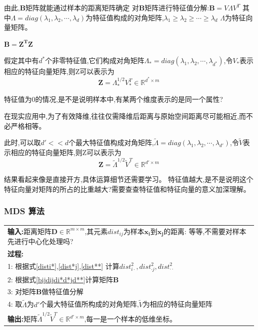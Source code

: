 \documentclass[UTF8,a4paper]{ctexart}%
\begin{document}
              由此,$\mathbf{B}$矩阵就能通过样本的距离矩阵确定
              对$\mathbf{B}$矩阵进行特征值分解:$\mathbf{B} = V\Lambda V^T$
              其中$\Lambda = diag(\lambda_1,\lambda_2,\cdots,\lambda_d)$为特征值构成的对角矩阵,$\lambda_1\geqslant \lambda_2\geqslant\cdots\geqslant\lambda_d$
              $\Lambda$为特征向量矩阵。

              $\mathbf{\mathbf{B}} = \mathbf{Z^TZ}$

              假定其中有$d^*$个非零特征值,它们构成对角矩阵$\Lambda_* = diag(\lambda_1,\lambda_2,\cdots,\lambda_{d^*})$,令$V_*$表示相应的特征向量矩阵,则Z可以表示为
              \[ \mathbf{Z} =\Lambda_*^{1/2}V_*^T \in \mathbb{R}^{d^* \times m}  \]

              {
              \color{red} 特征值为0的情况,是不是说明样本中,有某两个维度表示的是同一个属性?
              }

              在现实应用中,为了有效降维,往往仅需降维后距离与原始空间距离尽可能相近,而不必严格相等。

              此时,可以取$d' << d$个最大特征值构成对角矩阵,$\tilde{\Lambda } = diag(\lambda_1,\lambda_2,\cdots,\lambda_{d'} )$,令$\tilde{V}$表示相应的特征向量矩阵,则Z可以表示为
                \[ \mathbf{Z} =\tilde{\Lambda}^{1/2}\tilde{V}^T \in \mathbb{R}^{d' \times m}  \]

                {\color{red}
                    结果看起来像是直接开方,具体运算细节还需要学习。
                }
                {\color{red}
                  特征值越大,是不是说明这个特征向量对矩阵的所占的比重越大?需要查查特征值和特征向量的意义加深理解。
                }

            \subsubsection{MDS 算法}
            \begin{tabular}{l}
              \hline
              \textbf{输入:}距离矩阵$\mathbf{D} \in \mathbb{R}^{m \times m}$,其元素$dist_{ij}$为样本$\mathbf{x_i}$到$\mathbf{x_j}$的距离:
              {\color{red}等等,不需要对样本先进行中心化处理吗?}\\
            \textbf{过程:}\\
              1: 根据式\eqref{disti*},\eqref{dist*j},\eqref{dist**} 计算$    dist^2_{i \cdot},  dist^2_{\cdot j},dist^2_{\cdot \cdot}$\\
              2: 根据式\eqref{bijdijdi*d*jd**}计算矩阵$\mathbf{B}$\\
              3: 对矩阵$\mathbf{B}$做特征值分解\\
              4: 取$\tilde{\Lambda}$为$d'$个最大特征值所构成的对角矩阵,$\tilde{V}$为相应的特征向量矩阵\\
              \textbf{输出:}矩阵$\tilde{\Lambda}^{1/2}\tilde{V}^T \in \mathbb{R}^{d' \times m}$,每一是一个样本的低维坐标。\\
              \hline
            \end{tabular}
\end{document}
